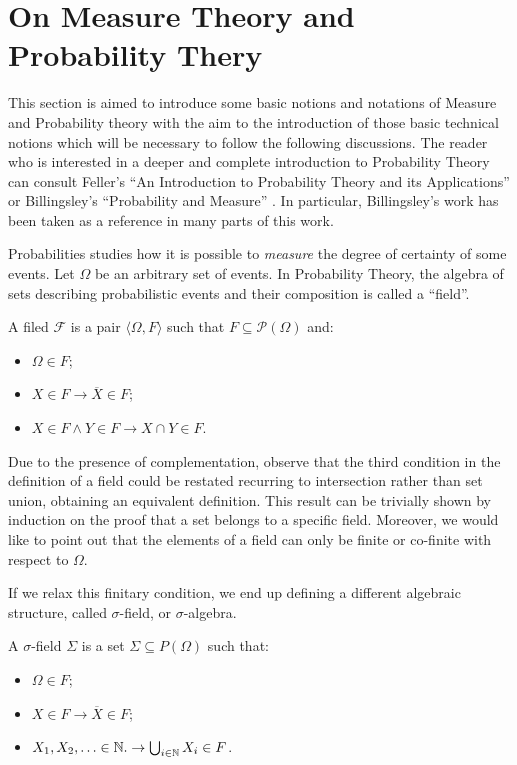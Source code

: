 \section{On Measure Theory and Probability Thery}

This section is aimed to introduce some basic notions and notations of Measure
and Probability theory with the aim to
the introduction of those basic technical notions which will be necessary to follow
the following discussions.
%
The reader who is interested in a deeper and complete introduction
to Probability Theory can consult Feller's
``An Introduction to Probability Theory and its Applications'' \cite{feller1968introduction}
or Billingsley's  ``Probability and Measure'' \cite{Billingsley}.
%
In particular, Billingsley's work has been taken as a reference in many parts of this work.

Probabilities studies how it is possible to \emph{measure} the degree of certainty of some events.
Let $\Omega$ be an arbitrary set of events.
In Probability Theory, the algebra of sets describing probabilistic events and their composition is called a ``field''.

\begin{defn}[Field]
  A filed $\mathcal F$ is a pair $\langle \Omega, F\rangle$ such that $F \subseteq \mathcal P(\Omega)$ and:
  \begin{itemize}
    \item $\Omega \in F$;
    \item $X \in F \to \overline X \in F$;
    \item $X \in F \land Y \in F \to  X \cap Y \in F$.
  \end{itemize}
\end{defn}

\noindent
Due to the presence of complementation, observe that the third
condition in the definition of a field could be restated
recurring to intersection rather than set
union, obtaining an equivalent definition. This result can be
trivially shown by induction on the proof that a set belongs to a
specific field.
%
Moreover, we would like to point out that the elements of a field can only be finite or co-finite with respect to $\Omega$.

If we relax this finitary condition, we end up defining a different
algebraic structure, called $\sigma$-field, or $\sigma$-algebra.

\begin{defn}
  A $\sigma$-field $\Sigma$ is a set $\Sigma \subseteq P(\Omega)$ such that:
  \begin{itemize}
    \item $\Omega \in F$;
    \item $X \in F \to \overline X \in F$;
    \item $X_1, X_2, \ldots \in \mathbb{N}. \to \bigcup_{i \in \mathbb{N}} X_i \in F$.
  \end{itemize}
\end{defn}

